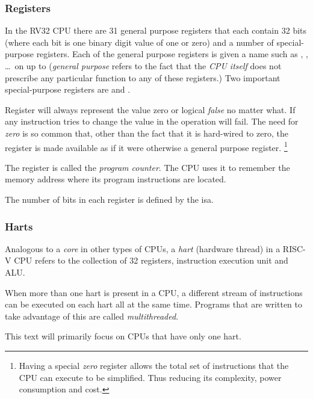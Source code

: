 \subsubsection{Registers}

In the RV32 CPU there are 31 general purpose registers that each contain 32 \gls{bit}s 
(where each bit is one \gls{binary} digit value of one or zero) and a number 
of special-purpose registers.
Each of the general purpose registers is given a name such as , ,
\ldots\ on up to  ({\em general purpose} refers to the fact that the 
{\em CPU itself} does not prescribe any particular function to any of these registers.)
Two important special-purpose registers are  and .

Register  will always represent the value zero or logical {\em false}  
no matter what.  If any instruction tries to change the value in  the 
operation will fail.  The need for {\em zero} is so common that, other than the 
fact that it is hard-wired to zero, the  register is made available as 
if it were otherwise a general purpose register.%
\footnote{Having a special 
{\em zero} register allows the total set of instructions that the CPU can execute 
to be simplified.  Thus reducing its complexity, power consumption and cost.} 

The  register is called the {\em program counter}.  The CPU uses it to
remember the memory address where its program instructions are located.

%
The number of bits in each register is defined by the \acrfull{isa}.

\subsubsection{Harts}

Analogous to a {\em core} in other types of CPUs, a {\em \acrshort{hart}} 
(hardware \gls{thread}) in a RISC-V CPU refers to the collection of 32 registers,
instruction execution unit and ALU.\cite[p.~20]{rvismv1v22:2017}

When more than one hart is present in a CPU, a different stream of instructions can 
be executed on each hart all at the same time.
Programs that are written to take advantage of this are called {\em multithreaded}.

This text will primarily focus on CPUs that have only one hart.

